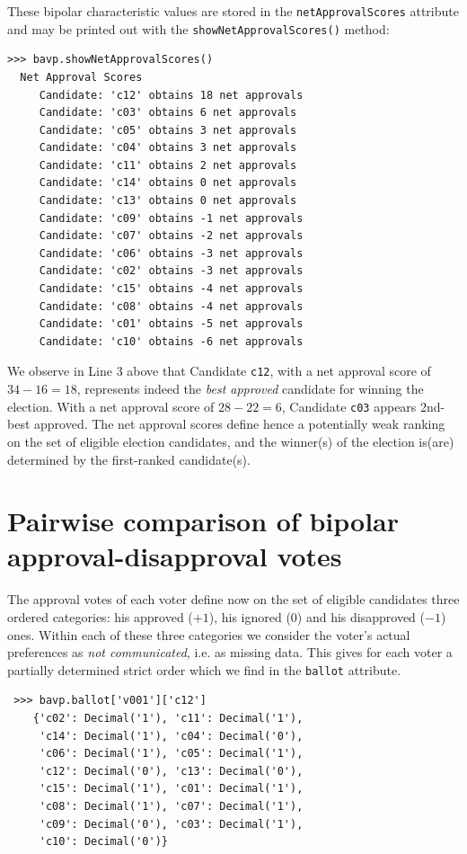These bipolar characteristic values are stored in the \texttt{netApprovalScores} attribute and may be printed out with the \texttt{showNetApprovalScores()} method:
\begin{lstlisting}
>>> bavp.showNetApprovalScores()
  Net Approval Scores
     Candidate: 'c12' obtains 18 net approvals
     Candidate: 'c03' obtains 6 net approvals
     Candidate: 'c05' obtains 3 net approvals
     Candidate: 'c04' obtains 3 net approvals
     Candidate: 'c11' obtains 2 net approvals
     Candidate: 'c14' obtains 0 net approvals
     Candidate: 'c13' obtains 0 net approvals
     Candidate: 'c09' obtains -1 net approvals
     Candidate: 'c07' obtains -2 net approvals
     Candidate: 'c06' obtains -3 net approvals
     Candidate: 'c02' obtains -3 net approvals
     Candidate: 'c15' obtains -4 net approvals
     Candidate: 'c08' obtains -4 net approvals
     Candidate: 'c01' obtains -5 net approvals
     Candidate: 'c10' obtains -6 net approvals
\end{lstlisting}

We observe in Line 3 above that Candidate \texttt{c12}, with a net approval score of $34 - 16 = 18$, represents indeed the \emph{best approved} candidate for winning the election. With a net approval score of $28-22 = 6$, Candidate \texttt{c03} appears 2nd-best approved. The net approval scores define hence a potentially weak ranking on the set of eligible election candidates, and the winner(s) of the election is(are) determined by the first-ranked candidate(s).

\section{Pairwise comparison of bipolar approval-disapproval votes}
\label{sec:20.3}

The approval votes of each voter define now on the set of eligible candidates three ordered categories: his approved ($+1$), his ignored ($0$) and his disapproved ($-1$) ones. Within each of these three categories we consider the voter's actual preferences as \emph{not communicated}, i.e. as missing data. This gives for each voter a partially determined strict order which we find in the \texttt{ballot} attribute.
\begin{lstlisting}
 >>> bavp.ballot['v001']['c12']
    {'c02': Decimal('1'), 'c11': Decimal('1'),
     'c14': Decimal('1'), 'c04': Decimal('0'),
     'c06': Decimal('1'), 'c05': Decimal('1'),
     'c12': Decimal('0'), 'c13': Decimal('0'),
     'c15': Decimal('1'), 'c01': Decimal('1'),
     'c08': Decimal('1'), 'c07': Decimal('1'),
     'c09': Decimal('0'), 'c03': Decimal('1'),
     'c10': Decimal('0')}
\end{lstlisting}

